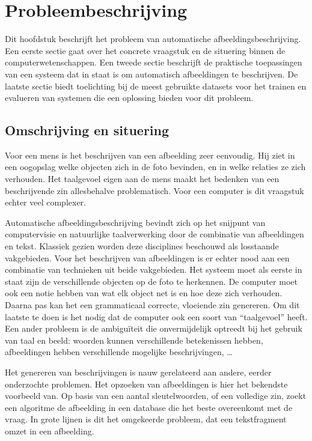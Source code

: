 \chapter{Probleembeschrijving}
\label{chap:Probleembeschrijving}
Dit hoofdstuk beschrijft het probleem van automatische afbeeldingsbeschrijving. Een eerste sectie gaat over het concrete vraagstuk en de situering binnen de computerwetenschappen. Een tweede sectie beschrijft de praktische toepassingen van een systeem dat in staat is om automatisch afbeeldingen te beschrijven. De laatste sectie biedt toelichting bij de meest gebruikte datasets voor het trainen en evalueren van systemen die een oplossing bieden voor dit probleem.

\section{Omschrijving en situering}
\label{sec:Omschrijving en situering}
Voor een mens is het beschrijven van een afbeelding zeer eenvoudig. Hij ziet in een oogopslag welke objecten zich in de foto bevinden, en in welke relaties ze zich verhouden. Het taalgevoel eigen aan de mens maakt het bedenken van een beschrijvende zin allesbehalve problematisch.
Voor een computer is dit vraagstuk echter veel complexer.

Automatische afbeeldingsbeschrijving bevindt zich op het snijpunt van computervisie en natuurlijke taalverwerking door de combinatie van afbeeldingen en tekst. Klassiek gezien worden deze disciplines beschouwd als losstaande vakgebieden. Voor het beschrijven van afbeeldingen is er echter nood aan een combinatie van technieken uit beide vakgebieden. Het systeem moet als eerste in staat zijn de verschillende objecten op de foto te herkennen. De computer moet ook een notie hebben van wat elk object net is en hoe deze zich verhouden. Daarna pas kan het een grammaticaal correcte, vloeiende zin genereren. Om dit laatste te doen is het nodig dat de computer ook een soort van ``taalgevoel'' heeft. Een ander probleem is de ambigu\"iteit die onvermijdelijk optreedt bij het gebruik van taal en beeld: woorden kunnen verschillende betekenissen hebben, afbeeldingen hebben verschillende mogelijke beschrijvingen, \ldots

Het genereren van beschrijvingen is nauw gerelateerd aan andere, eerder onderzochte problemen. Het opzoeken van afbeeldingen is hier het bekendste voorbeeld van. Op basis van een aantal sleutelwoorden, of een volledige zin, zoekt een algoritme de afbeelding in een database die het beste overeenkomt met de vraag. In grote lijnen is dit het omgekeerde probleem, dat een tekstfragment omzet in een afbeelding.


